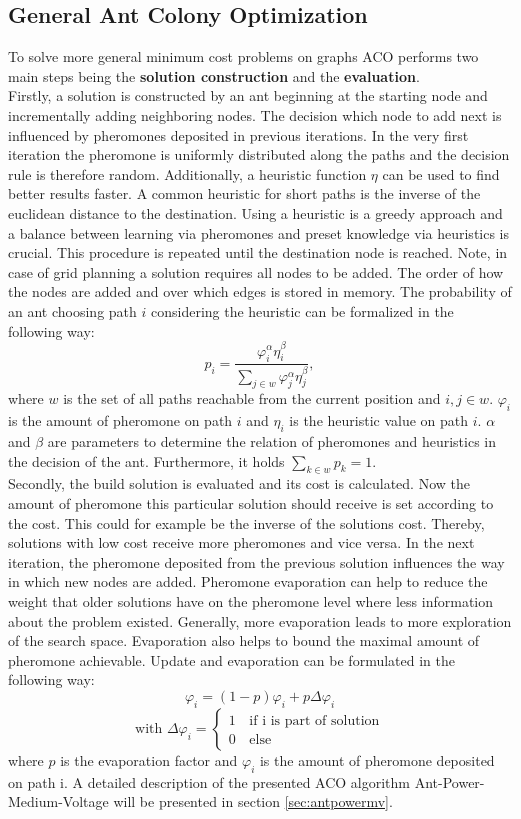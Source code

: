 \subsection{General Ant Colony Optimization}
To solve more general minimum cost problems on graphs ACO performs two main steps being the \textbf{solution construction} and the \textbf{evaluation}.\\
Firstly, a solution is constructed by an ant beginning at the starting node and incrementally adding neighboring nodes. The decision which node to add next is influenced by pheromones deposited in previous iterations. In the very first iteration the pheromone is uniformly distributed along the paths and the decision rule is therefore random. Additionally, a heuristic function $\eta$ can be used to find better results faster. A common heuristic for short paths is the inverse of the euclidean distance to the destination. Using a heuristic is a greedy approach and a balance between learning via pheromones and preset knowledge via heuristics is crucial. This procedure is repeated until the destination node is reached. Note, in case of grid planning a solution requires all nodes to be added. The order of how the nodes are added and over which edges is stored in memory.
The probability of an ant choosing path $i$ considering the heuristic can be formalized in the following way:
$$p_i = \frac{\varphi_i^\alpha\eta_i^\beta}{\sum_{j\in{w}}\varphi_j^\alpha\eta_j^\beta},$$
where $w$ is the set of all paths reachable from the current position and $i,j \in w$. $\varphi_i$ is the amount of pheromone on path $i$ and $\eta_i$ is the heuristic value on path $i$. $\alpha$ and $\beta$ are parameters to determine the relation of pheromones and heuristics in the decision of the ant. Furthermore, it holds $\sum_{k\in{w}}p_k = 1$. \\
Secondly, the build solution is evaluated and its cost is calculated. Now the amount of pheromone this particular solution should receive is set according to the cost. This could for example be the inverse of the solutions cost. Thereby, solutions with low cost receive more pheromones and vice versa. In the next iteration, the pheromone deposited from the previous solution influences the way in which new nodes are added. Pheromone evaporation can help to reduce the weight that older solutions have on the pheromone level where less information about the problem existed. Generally, more evaporation leads to more exploration of the search space. Evaporation also helps to bound the maximal amount of pheromone achievable. Update and evaporation can be formulated in the following way:
$$\varphi_i = (1-p)\varphi_i + p\Delta\varphi_i$$
$$\text{with } \Delta\varphi_i = \begin{cases}
	1 & \, \text{if i is part of solution}\\
	0 & \, \text{else}
\end{cases}$$
where $p$ is the evaporation factor and $\varphi_i$ is the amount of pheromone deposited on path i.
A detailed description of the presented ACO algorithm Ant-Power-Medium-Voltage will be presented in section \ref{sec:antpowermv}.


